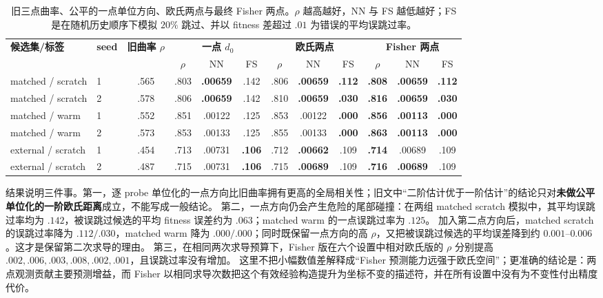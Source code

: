 \documentclass[UTF8,11pt]{ctexart}
\begin{document}
\begin{table}[t]
\centering
\scriptsize
\setlength{\tabcolsep}{3.2pt}
\caption{旧三点曲率、公平的一点单位方向、欧氏两点与最终 Fisher 两点。$\rho$ 越高越好，NN 与 FS 越低越好；FS 是在随机历史顺序下模拟 $20\%$ 跳过、并以 fitness 差超过 $.01$ 为错误的平均误跳过率。}
\label{tab:main-ablation}
\begin{tabular}{llc ccc ccc ccc}
\toprule
\textbf{候选集/标签} & \textbf{seed} & \textbf{旧曲率 $\rho$}
& \multicolumn{3}{c}{\textbf{一点 $d_0$}}
& \multicolumn{3}{c}{\textbf{欧氏两点}}
& \multicolumn{3}{c}{\textbf{Fisher 两点}}\\
\cmidrule(lr){4-6}\cmidrule(lr){7-9}\cmidrule(lr){10-12}
& & & $\rho$ & NN & FS & $\rho$ & NN & FS & $\rho$ & NN & FS\\
\midrule
matched / scratch & 1 & .565 & .803 & \textbf{.00659} & .142 & .806 & \textbf{.00659} & \textbf{.112} & \textbf{.808} & \textbf{.00659} & \textbf{.112}\\
matched / scratch & 2 & .578 & .806 & \textbf{.00659} & .142 & .810 & \textbf{.00659} & \textbf{.030} & \textbf{.816} & \textbf{.00659} & \textbf{.030}\\
matched / warm    & 1 & .552 & .851 & .00122 & .125 & .853 & .00122 & \textbf{.000} & \textbf{.856} & \textbf{.00113} & \textbf{.000}\\
matched / warm    & 2 & .573 & .853 & .00133 & .125 & .855 & .00133 & \textbf{.000} & \textbf{.863} & \textbf{.00113} & \textbf{.000}\\
external / scratch& 1 & .454 & .713 & .00731 & \textbf{.106} & .712 & \textbf{.00662} & .109 & \textbf{.714} & .00689 & .109\\
external / scratch& 2 & .487 & .715 & .00731 & \textbf{.106} & .715 & \textbf{.00689} & .109 & \textbf{.716} & \textbf{.00689} & .109\\
\bottomrule
\end{tabular}
\end{table}

结果说明三件事。第一，逐 probe 单位化的一点方向比旧曲率拥有更高的全局相关性；旧文中“二阶估计优于一阶估计”的结论只对\textbf{未做公平单位化的一阶欧氏距离}成立，不能写成一般结论。
第二，一点方向仍会产生危险的尾部碰撞：在两组 matched scratch 模拟中，其平均误跳过率均为 $.142$，被误跳过候选的平均 fitness 误差约为 $.063$；matched warm 的一点误跳过率为 $.125$。
加入第二点方向后，matched scratch 的误跳过率降为 $.112/.030$，matched warm 降为 $.000/.000$；同时既保留一点方向的高 $\rho$，又把被误跳过候选的平均误差降到约 $0.001$--$0.006$。这才是保留第二次求导的理由。
第三，在相同两次求导预算下，Fisher 版在六个设置中相对欧氏版的 $\rho$ 分别提高 $.002,.006,.003,.008,.002,.001$，且误跳过率没有增加。
这里不把小幅数值差解释成“Fisher 预测能力远强于欧氏空间”；更准确的结论是：两点观测贡献主要预测增益，而 Fisher 以相同求导次数把这个有效经验构造提升为坐标不变的描述符，并在所有设置中没有为不变性付出精度代价。
\end{document}
